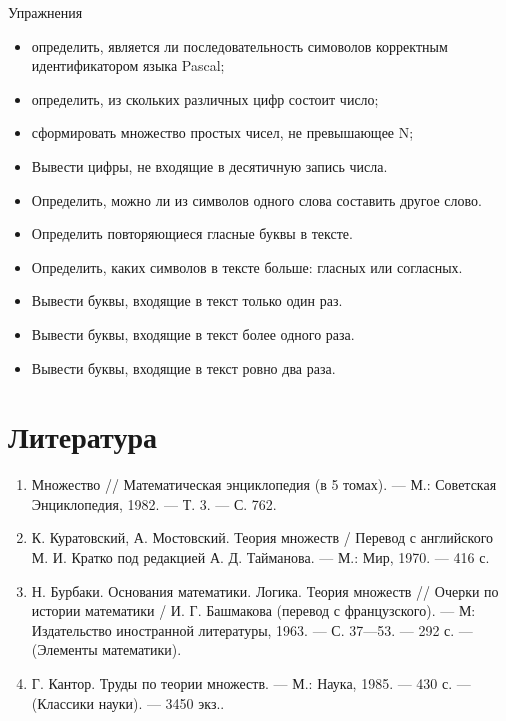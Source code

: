 \documentclass{beamer}
\begin{document}
\begin{frame}
\begin{block}{Упражнения}
\begin{itemize}
\item определить, является ли последовательность симоволов корректным идентификатором языка Pascal;
\item определить, из скольких различных цифр состоит число;
\item сформировать множество простых чисел, не превышающее N;
\item Вывести цифры, не входящие в десятичную запись числа.
\item Определить, можно ли из символов одного слова составить другое слово.
\item Определить повторяющиеся гласные буквы в тексте.
\item Определить, каких символов в тексте больше: гласных или согласных.
\item Вывести буквы, входящие в текст только один раз.
\item Вывести буквы, входящие в текст более одного раза.
\item Вывести буквы, входящие в текст ровно два раза.
\end{itemize}
\end{block}
\end{frame}    
  
\section*{Литература}
\begin{frame}   
\begin{enumerate}
\item Множество // Математическая энциклопедия (в 5 томах). — М.: Советская Энциклопедия, 1982. — Т. 3. — С. 762.
\item К. Куратовский, А. Мостовский. Теория множеств / Перевод с английского М. И. Кратко под редакцией А. Д. Тайманова. — М.: Мир, 1970. — 416 с.
\item Н. Бурбаки. Основания математики. Логика. Теория множеств // Очерки по истории математики / И. Г. Башмакова (перевод с французского). — М: Издательство иностранной литературы, 1963. — С. 37—53. — 292 с. — (Элементы математики).
\item Г. Кантор. Труды по теории множеств. — М.: Наука, 1985. — 430 с. — (Классики науки). — 3450 экз..
\end{enumerate}
\end{frame}   
\end{document}
